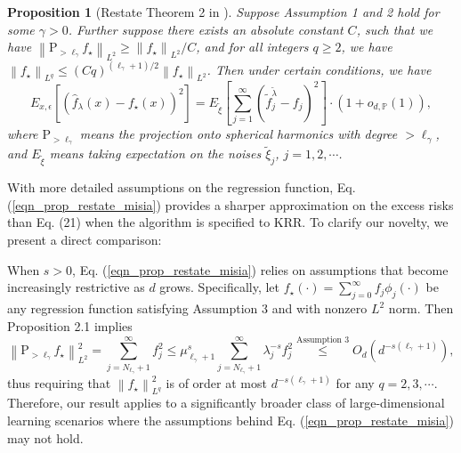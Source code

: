 \documentclass{article}
\theoremstyle{plain}
\newtheorem{proposition}[theorem]{Proposition}
\theoremstyle{definition}
\theoremstyle{remark}
\newcommand{\green}{\color{green}}
\begin{document}
\begin{appendix}
\begin{proposition}[Restate Theorem 2 in \cite{misiakiewicz2024non}]\label{prop_restate_misia}
    Suppose Assumption 1 and 2 hold for some $\gamma>0$. 
    Further suppose there exists an absolute constant $C$, such that we have $\left\|\mathrm{P}_{>\ell_{\gamma}} f_{\star}\right\|_{L^2} \geq \left\|f_{\star}\right\|_{L^2} / C$, and for all integers $q \geq 2$,  we have $\left\|f_{\star}\right\|_{L^q} \leq (C q)^{(\ell_{\gamma}+1) / 2}\left\|f_{\star}\right\|_{L^2}$. Then under certain conditions, we have
    \begin{equation}\label{eqn_prop_restate_misia}
        E_{x, \epsilon} \left[ \left(\hat{f}_{\lambda}(x) - f_{\star}(x) \right)^{2} \right] = E_{\tilde{\xi}}\left[\sum_{j=1}^{\infty}(\tilde{f}_j^{\tilde{\lambda}} - f_j)^2\right] \cdot \left(1 + o_{d, \mathbb{P}}\left(1\right)\right),
    \end{equation}
where $\mathrm{P}_{>\ell_{\gamma}}$ means the projection onto spherical harmonics with degree $>\ell_{\gamma}$, and $E_{\tilde{\xi}}$ means taking expectation on the noises $\tilde{\xi}_j$, $j=1, 2, \cdots$.
\end{proposition}


With more detailed assumptions on the regression function, Eq. (\ref{eqn_prop_restate_misia}) provides a sharper approximation on the excess risks than Eq. (21) when the algorithm is specified to KRR. To clarify our novelty, we present a direct comparison:

When $s>0$, Eq. (\ref{eqn_prop_restate_misia}) relies on assumptions that become increasingly restrictive as $d$ grows. Specifically, let $f_{\star}(\cdot) = \sum_{j=0}^{\infty} f_j \phi_j(\cdot)$ be any regression function satisfying Assumption 3 and with nonzero \(L^2\) norm. Then Proposition 2.1 implies
    $$
        \left\|\mathrm{P}_{>\ell_{\gamma}} f_{\star}\right\|_{L^2}^2 = \sum_{j=N_{\ell_{\gamma}}+1}^{\infty} f_j^2 \leq \mu_{\ell_{\gamma}+1}^s \sum_{j=N_{\ell_{\gamma}}+1}^{\infty} \lambda_j^{-s} f_j^2 \overset{\text{Assumption 3}}{\leq} O_d \left(d^{-s(\ell_{\gamma}+1)}\right),
    $$
    thus requiring that $\left\|f_{\star}\right\|_{L^q}^2$ is of order at most $d^{-s(\ell_{\gamma}+1)}$ for any $q=2, 3, \cdots$. Therefore, our result applies to a significantly broader class of large-dimensional learning scenarios where the assumptions behind Eq. (\ref{eqn_prop_restate_misia}) may not hold.


\end{appendix}
\end{document}
